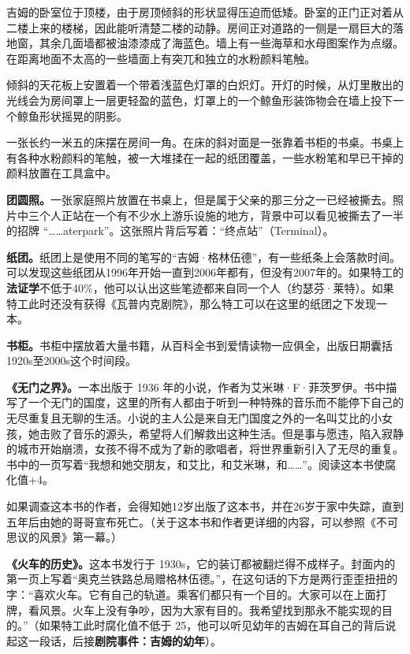 吉姆的卧室位于顶楼，由于房顶倾斜的形状显得压迫而低矮。卧室的正门正对着从二楼上来的楼梯，因此能听清楚二楼的动静。房间正对道路的一侧是一扇巨大的落地窗，其余几面墙都被油漆漆成了海蓝色。墙上有一些海草和水母图案作为点缀。在距离地面不太高的一些墙面上有突兀和独立的水粉颜料笔触。

倾斜的天花板上安置着一个带着浅蓝色灯罩的白炽灯。开灯的时候，从灯里散出的光线会为房间罩上一层更轻盈的蓝色，灯罩上的一个鲸鱼形装饰物会在墙上投下一个鲸鱼形状摇晃的阴影。

一张长约一米五的床摆在房间一角。在床的斜对面是一张靠着书柜的书桌。书桌上有各种水粉颜料的笔触，被一大堆揉在一起的纸团覆盖，一些水粉笔和早已干掉的颜料放置在工具盒中。

\textbf{团圆照。}一张家庭照片放置在书桌上，但是属于父亲的那三分之一已经被撕去。照片中三个人正站在一个有不少水上游乐设施的地方，背景中可以看见被撕去了一半的招牌 “……aterpark”。这张照片背后写着：“终点站”（Terminal）。

\textbf{纸团。}纸团上是使用不同的笔写的“吉姆·格林伍德”，有一些纸条上会落款时间。可以发现这些纸团从1996年开始一直到2006年都有，但没有2007年的。如果特工的\textbf{法证学}不低于40\%，他可以认出这些笔迹都来自同一个人（约瑟芬·莱特）。如果特工此时还没有获得《瓦普内克剧院》，那么特工可以在这里的纸团之下发现一本。

\textbf{书柜。}书柜中摆放着大量书籍，从百科全书到爱情读物一应俱全，出版日期囊括1920s至2000s这个时间段。

\textbf{《无门之界》。}一本出版于 1936 年的小说，作者为艾米琳·F·菲茨罗伊。书中描写了一个无门的国度，这里的所有人都由于听到一种特殊的音乐而不能停下自己的无尽重复且无聊的生活。小说的主人公是来自无门国度之外的一名叫艾比的小女孩，她击败了音乐的源头，希望将人们解救出这种生活。但是事与愿违，陷入寂静的城市开始崩溃，女孩不得不成为了新的歌唱者，将世界重新引入了无尽的重复。书中的一页写着“我想和她交朋友，和艾比，和艾米琳，和……”。阅读这本书使腐化值+4。

如果调查这本书的作者，会得知她12岁出版了这本书，并在26岁于家中失踪，直到五年后由她的哥哥宣布死亡。（关于这本书和作者更详细的内容，可以参照《不可思议的风景》第一幕。）

\textbf{《火车的历史》。}这本书发行于 1930s，它的装订都被翻烂得不成样子。封面内的第一页上写着“奥克兰铁路总局赠格林伍德。”，在这句话的下方是两行歪歪扭扭的字：“喜欢火车。它有自己的轨道。乘客们都只有一个目的。大家可以在上面打牌，看风景。火车上没有争吵，因为大家有目的。我希望找到那永不能实现的目的。”（如果特工此时腐化值不低于 25，他可以听见幼年的吉姆在耳自己的背后说起这一段话，后接\textbf{剧院事件：吉姆的幼年}）。

